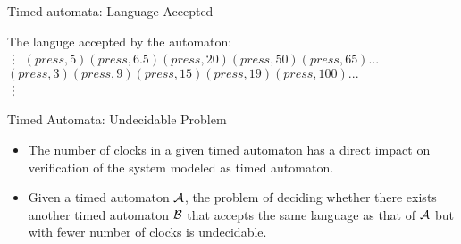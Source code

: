 \documentclass[10pt]{beamer}
\theoremstyle{plain}
\theoremstyle{definition}
\begin{document}
\begin{frame}{Timed automata: Language Accepted}
	\begin{figure}[!t]
	\begin{center}
		
	\end{center}
	\end{figure}
	The languge accepted by the automaton: \\
		\vdots
		$(press, 5) (press, 6.5) (press, 20) (press, 50) (press, 65) ...$
		$(press, 3) (press, 9) (press, 15) (press, 19) (press, 100) ...$\\
		\vdots
\end{frame}

\begin{frame}{Timed Automata: Undecidable Problem}
	\begin{itemize}
		\item The number of clocks in a given timed automaton has a direct impact on verification of the system modeled as timed automaton.
		\item Given a timed automaton $\cal A$, the problem of deciding whether there exists another timed automaton $\cal B$ that accepts the same language as that of $\cal A$ but with fewer number of clocks is undecidable.
		
	\end{itemize}
	\vspace{0.5cm}
	
\end{frame}
\end{document}
